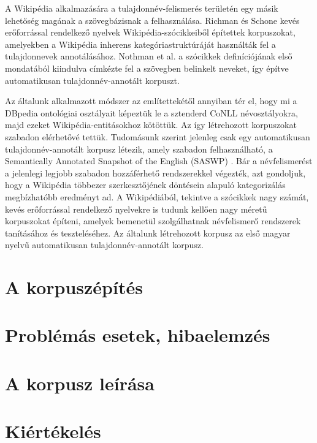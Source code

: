 \documentclass{llncs}
\begin{document}
A Wikipédia alkalmazására a tulajdonnév-felismerés területén egy másik lehetőség magának a szövegbázisnak a felhasználása. Richman és Schone \cite{Richman} kevés erőforrással rendelkező nyelvek Wikipédia-szócikkeiből építettek korpuszokat, amelyekben a Wikipédia inherens kategóriastruktúráját használták fel a tulajdonnevek annotálásához. Nothman et al. \cite{Nothman:2008} a szócikkek definíciójának első mondatából kiindulva címkézte fel a szövegben belinkelt neveket, így építve automatikusan tulajdonnév-annotált korpuszt. 

Az általunk alkalmazott módszer az említettekétől annyiban tér el, hogy mi a DBpedia ontológiai osztályait képeztük le a sztenderd CoNLL névosztályokra, majd ezeket Wikipédia-entitásokhoz kötöttük. Az így létrehozott korpuszokat szabadon elérhetővé tettük. Tudomásunk szerint jelenleg csak egy automatikusan tulajdonnév-annotált korpusz létezik, amely szabadon felhasználható, a Semantically Annotated Snapshot of the English (SASWP) \cite{Zaragoza}. Bár a névfelismerést a jelenlegi legjobb szabadon hozzáférhető rendszerekkel végezték, azt gondoljuk, hogy a Wikipédia többezer szerkesztőjének döntésein alapuló kategorizálás megbízhatóbb eredményt ad. A Wikipédiából, tekintve a szócikkek nagy számát, kevés erőforrással rendelkező nyelvekre is tudunk kellően nagy méretű korpuszokat építeni, amelyek bemenetül szolgálhatnak névfelismerő rendszerek tanításához és teszteléséhez. Az általunk létrehozott korpusz az első magyar nyelvű automatikusan tulajdonnév-annotált korpusz. 

\section{A korpuszépítés}

\section{Problémás esetek, hibaelemzés}

\section{A korpusz leírása}

\section{Kiértékelés}
\end{document}

